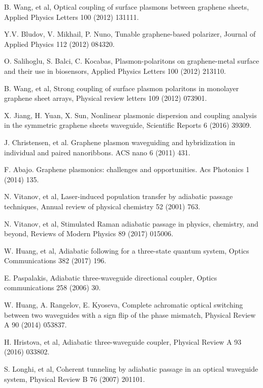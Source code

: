 \documentclass[preprint,12pt,numbers,sort&compress]{elsarticle}
\begin{document}
\begin{thebibliography}{99}
 B. Wang, et al, Optical coupling of surface plasmons between graphene sheets, Applied Physics Letters 100 (2012) 131111.

 Y.V. Bludov, V. Mikhail, P. Nuno, Tunable graphene-based polarizer, Journal of Applied Physics 112 (2012) 084320.

 O. Salihoglu, S. Balci, C. Kocabas, Plasmon-polaritons on graphene-metal surface and their use in biosensors, Applied Physics Letters 100 (2012) 213110.

 B. Wang, et al, Strong coupling of surface plasmon polaritons in monolayer graphene sheet arrays, Physical review letters 109 (2012) 073901.

 X. Jiang, H. Yuan, X. Sun, Nonlinear plasmonic dispersion and coupling analysis in the symmetric graphene sheets waveguide, Scientific Reports  6 (2016) 39309.

 J. Christensen, et al. Graphene plasmon waveguiding and hybridization in individual and paired nanoribbons. ACS nano 6 (2011) 431.

 F. Abajo. Graphene plasmonics: challenges and opportunities. Acs Photonics 1 (2014) 135.

 N. Vitanov, et al, Laser-induced population transfer by adiabatic passage techniques, Annual review of physical chemistry 52 (2001) 763.

 N. Vitanov, et al, Stimulated Raman adiabatic passage in physics, chemistry, and beyond, Reviews of Modern Physics 89 (2017) 015006.

 W. Huang, et al, Adiabatic following for a three-state quantum system, Optics Communications 382 (2017) 196.

 E. Paspalakis, Adiabatic three-waveguide directional coupler, Optics communications 258 (2006) 30.

 W. Huang, A. Rangelov, E. Kyoseva, Complete achromatic optical switching between two waveguides with a sign flip of the phase mismatch, Physical Review A 90 (2014) 053837.

 H. Hristova, et al, Adiabatic three-waveguide coupler, Physical Review A 93 (2016) 033802.

 S. Longhi, et al, Coherent tunneling by adiabatic passage in an optical waveguide system, Physical Review B 76 (2007) 201101.


\end{thebibliography}
\end{document}
